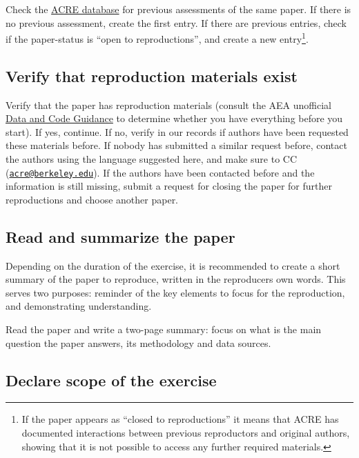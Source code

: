 \documentclass[]{book}
\begin{document}
Check the \href{ADD\%20LINK}{ACRE database} for previous assessments of the same paper. If there is no previous assessment, create the first entry. If there are previous entries, check if the paper-status is ``open to reproductions'', and create a new entry\footnote{If the paper appears as ``closed to reproductions'' it means that ACRE has documented interactions between previous reproductors and original authors, showing that it is not possible to access any further required materials. }.

\hypertarget{verify-rep-mat}{%
\subsection{Verify that reproduction materials exist}\label{verify-rep-mat}}

Verify that the paper has reproduction materials (consult the AEA unofficial \href{https://social-science-data-editors.github.io/guidance/Verification_guidance.html}{Data and Code Guidance} to determine whether you have everything before you start). If yes, continue. If no, verify in our records if authors have been requested these materials before. If nobody has submitted a similar request before, contact the authors using the language suggested here, and make sure to CC (\href{mailto:acre@berkeley.edu}{\nolinkurl{acre@berkeley.edu}}). If the authors have been contacted before and the information is still missing, submit a request for closing the paper for further reproductions and choose another paper.

\hypertarget{read-sum}{%
\subsection{Read and summarize the paper}\label{read-sum}}

Depending on the duration of the exercise, it is recommended to create a short summary of the paper to reproduce, written in the reproducers own words. This serves two purposes: reminder of the key elements to focus for the reproduction, and demonstrating understanding.

Read the paper and write a two-page summary: focus on what is the main question the paper answers, its methodology and data sources.

\hypertarget{declare-scope-of-the-exercise}{%
\subsection{Declare scope of the exercise}\label{declare-scope-of-the-exercise}}
\end{document}
